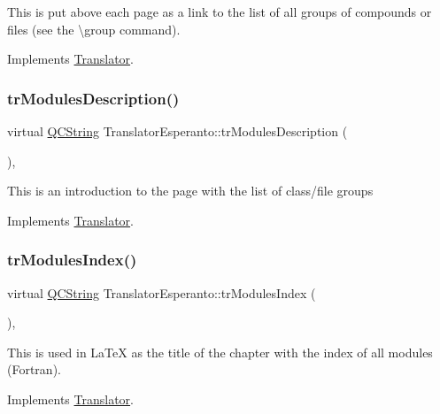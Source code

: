 This is put above each page as a link to the list of all groups of compounds or files (see the \textbackslash{}group command). 

Implements \mbox{\hyperlink{class_translator}{Translator}}.

\mbox{\label{class_translator_esperanto_a1dcad5d3d0d2ae276718269e8d9cb814}} 
\subsubsection{\texorpdfstring{trModulesDescription()}{trModulesDescription()}}
{\footnotesize\ttfamily virtual \mbox{\hyperlink{class_q_c_string}{Q\+C\+String}} Translator\+Esperanto\+::tr\+Modules\+Description (\begin{DoxyParamCaption}{ }\end{DoxyParamCaption})\hspace{0.3cm}{\ttfamily [inline]}, {\ttfamily [virtual]}}

This is an introduction to the page with the list of class/file groups 

Implements \mbox{\hyperlink{class_translator}{Translator}}.

\mbox{\label{class_translator_esperanto_a0d77c837692e59480c02555d10678aad}} 
\subsubsection{\texorpdfstring{trModulesIndex()}{trModulesIndex()}}
{\footnotesize\ttfamily virtual \mbox{\hyperlink{class_q_c_string}{Q\+C\+String}} Translator\+Esperanto\+::tr\+Modules\+Index (\begin{DoxyParamCaption}{ }\end{DoxyParamCaption})\hspace{0.3cm}{\ttfamily [inline]}, {\ttfamily [virtual]}}

This is used in La\+TeX as the title of the chapter with the index of all modules (Fortran). 

Implements \mbox{\hyperlink{class_translator}{Translator}}.

